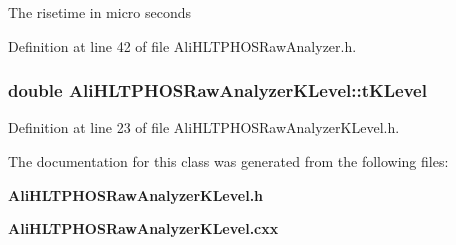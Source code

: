 The risetime in micro seconds 

Definition at line 42 of file Ali\-HLTPHOSRaw\-Analyzer.h.
\subsubsection{\setlength{\rightskip}{0pt plus 5cm}double {\bf Ali\-HLTPHOSRaw\-Analyzer\-KLevel::t\-KLevel}\hspace{0.3cm}{\tt  [private]}}\label{classAliHLTPHOSRawAnalyzerKLevel_AliHLTPHOSRawAnalyzerKLevelr0}




Definition at line 23 of file Ali\-HLTPHOSRaw\-Analyzer\-KLevel.h.

The documentation for this class was generated from the following files:\begin{CompactItemize}
\item 
{\bf Ali\-HLTPHOSRaw\-Analyzer\-KLevel.h}\item 
{\bf Ali\-HLTPHOSRaw\-Analyzer\-KLevel.cxx}\end{CompactItemize}
